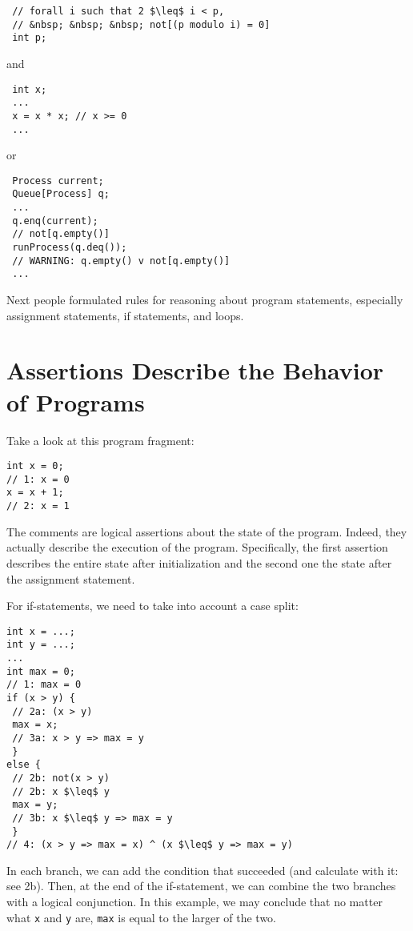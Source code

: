 \documentclass[11pt]{article}
\begin{document}
\begin{verbatim}
 // forall i such that 2 $\leq$ i < p, 
 // &nbsp; &nbsp; &nbsp; not[(p modulo i) = 0]
 int p; 
\end{verbatim}

and

\begin{verbatim}
 int x; 
 ...
 x = x * x; // x >= 0
 ...  
\end{verbatim}

or 

\begin{verbatim}
 Process current; 
 Queue[Process] q; 
 ... 
 q.enq(current); 
 // not[q.empty()]
 runProcess(q.deq()); 
 // WARNING: q.empty() v not[q.empty()]
 ...
\end{verbatim}


Next people formulated rules for reasoning about program statements,
  especially assignment statements, if statements, and loops. 


\section{Assertions Describe the Behavior of Programs}

Take a look at this program fragment: 
\begin{verbatim}
int x = 0; 
// 1: x = 0 
x = x + 1; 
// 2: x = 1 
\end{verbatim}
The comments are logical assertions about the state of the program. Indeed,
they actually describe the execution of the program. Specifically, the
first assertion describes the entire state after initialization and the
second one the state after the assignment statement. 


For if-statements, we need to take into account a case split: 
\begin{verbatim}
int x = ...; 
int y = ...; 
... 
int max = 0; 
// 1: max = 0 
if (x > y) { 
 // 2a: (x > y) 
 max = x; 
 // 3a: x > y => max = y
 } 
else {
 // 2b: not(x > y)
 // 2b: x $\leq$ y
 max = y; 
 // 3b: x $\leq$ y => max = y
 }
// 4: (x > y => max = x) ^ (x $\leq$ y => max = y) 
\end{verbatim}

In each branch, we can add the condition that succeeded (and calculate with
it: see 2b). Then, at the end of the if-statement, we can combine the two
branches with a logical conjunction. In this example, we may conclude that
no matter what {\tt x} and {\tt y} are, {\tt max} is
equal to the larger of the two.
\end{document}

